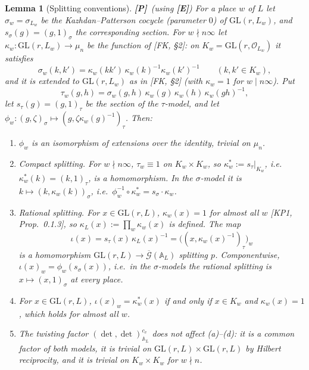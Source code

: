 \documentclass[12pt]{article}
\newcommand{\ov}[1]{\overline{#1}}
\newcommand{\A}{\mathbb{A}}
\newcommand{\cO}{\mathcal{O}}
\newcommand{\GL}{\mathrm{GL}}
\newcommand{\ks}{\kappa^{*}}
\newcommand{\cGb}{\ov{\mathcal{G}}}
\newcommand{\Pv}{\textbf{[P]}}
\newcommand{\Ev}{\textbf{[E]}}
\theoremstyle{plain}
\newtheorem{lemma}[theorem]{Lemma}
\theoremstyle{definition}
\begin{document}
\begin{lemma}[Splitting conventions]\label{lem:splittings}\Pv\ (using \Ev)
For a place $w$ of $L$ let $\sigma_w=\sigma_{L_w}$ be the Kazhdan--Patterson cocycle (parameter $0$) of $\GL(r,L_w)$, and $s_\sigma(g)=(g,1)_\sigma$ the corresponding section. For $w\nmid n\infty$ let $\kappa_w:\GL(r,L_w)\to\mu_n$ be the function of [FK, \S2]: on $K_w=\GL(r,\cO_{L_w})$ it satisfies
\begin{equation}\label{eq:kappaK}
\sigma_w(k,k')=\kappa_w(kk')\,\kappa_w(k)^{-1}\kappa_w(k')^{-1}\qquad(k,k'\in K_w),
\end{equation}
and it is extended to $\GL(r,L_w)$ as in [FK, \S2] (with $\kappa_w=1$ for $w\mid n\infty$). Put
\begin{equation}\label{eq:tausigma}
\tau_w(g,h)=\sigma_w(g,h)\,\kappa_w(g)\,\kappa_w(h)\,\kappa_w(gh)^{-1},
\end{equation}
let $s_\tau(g)=(g,1)_\tau$ be the section of the $\tau$-model, and let $\phi_w:(g,\zeta)_\sigma\mapsto(g,\zeta\kappa_w(g)^{-1})_\tau$. Then:
\begin{enumerate}[label=(\alph*)]
\item $\phi_w$ is an isomorphism of extensions over the identity, trivial on $\mu_n$.
\item \emph{Compact splitting.} For $w\nmid n\infty$, $\tau_w\equiv1$ on $K_w\times K_w$, so $\ks_w:=s_\tau|_{K_w}$, i.e.\ $\ks_w(k)=(k,1)_\tau$, is a homomorphism. In the $\sigma$-model it is $k\mapsto(k,\kappa_w(k))_\sigma$, i.e.\ $\phi_w^{-1}\circ\ks_w=s_\sigma\cdot\kappa_w$.
\item \emph{Rational splitting.} For $x\in\GL(r,L)$, $\kappa_w(x)=1$ for almost all $w$ [KP1, Prop.~0.1.3], so $\kappa_L(x):=\prod_w\kappa_w(x)$ is defined. The map
\[ \iota(x)=s_\tau(x)\,\kappa_L(x)^{-1}=\big((x,\kappa_w(x)^{-1})_\tau\big)_w \]
is a homomorphism $\GL(r,L)\to\cGb(\A_L)$ splitting $p$. Componentwise, $\iota(x)_w=\phi_w(s_\sigma(x))$, i.e.\ in the $\sigma$-models the rational splitting is $x\mapsto(x,1)_\sigma$ at every place.
\item For $x\in\GL(r,L)$, $\iota(x)_w=\ks_w(x)$ if and only if $x\in K_w$ and $\kappa_w(x)=1$, which holds for almost all $w$.
\item The twisting factor $(\det,\det)^{c_v}_{\A_L}$ does not affect (a)--(d): it is a common factor of both models, it is trivial on $\GL(r,L)\times\GL(r,L)$ by Hilbert reciprocity, and it is trivial on $K_w\times K_w$ for $w\nmid n$.
\end{enumerate}
\end{lemma}
\end{document}
